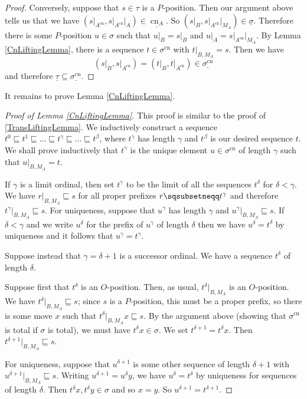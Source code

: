 \documentclass[11pt]{article} %
\theoremstyle{plain} %
\theoremstyle{definition} %
\theoremstyle{note}
\theoremstyle{exercisestyle}
\newcommand{\prefix}{\sqsubseteq}
\newcommand{\pprefix}{\sqsubsetneqq}
\newcommand{\grel}[1]{\underline{#1}}
\DeclareMathOperator{\cn}{cn}
\begin{document}
\begin{proof}
  Conversely, suppose that $s\in\tau$ is a $P$-position.  Then our argument above tells us that we have $(s\vert_{A^{\cn}},s\vert_{A^{\cn}}\vert_A)\in\grel{\cn_A}$.  So $(s\vert_B,s\vert_{A^{\cn}}\vert_{M_A})\in\grel\sigma$.  Therefore there is some $P$-position $u\in\sigma$ such that $u\vert_B=s\vert_B$ and $u\vert_A=s\vert_{A^{\cn}}\vert_{M_A}$.  By Lemma \ref{CnLiftingLemma}, there is a sequence $t\in\sigma^{\cn}$ with $t\vert_{B,M_A}=s$.  Then we have
  \[
    (s\vert_B,s\vert_{A^{\cn}})=(t\vert_B,t\vert_{A^{\cn}})\in\grel{\sigma^{\cn}}
    \]
  and therefore $\grel\tau\subseteq\grel{\sigma^{\cn}}$.  
\end{proof}

It remains to prove Lemma \ref{CnLiftingLemma}.  

\begin{proof}[Proof of Lemma \ref{CnLiftingLemma}]
  This proof is similar to the proof of \ref{TransLiftingLemma}.  We inductively construct a sequence $t^0\prefix t^1\prefix\dots\prefix t^\gamma\prefix\dots\prefix t^\beta$, where $t^\gamma$ has length $\gamma$ and $t^\beta$ is our desired sequence $t$.  We shall prove inductively that $t^\gamma$ is the unique element $u\in\sigma^{\cn}$ of length $\gamma$ such that $u\vert_{B,M_A}=t$.

  If $\gamma$ is a limit ordinal, then set $t^\gamma$ to be the limit of all the sequences $t^\delta$ for $\delta<\gamma$.  We have $r\vert_{B,M_A}\prefix s$ for all proper prefixes $r\pprefix t^{\gamma}$ and therefore $t^\gamma\vert_{B,M_A}\prefix s$.  For uniqueness, suppose that $u^\gamma$ has length $\gamma$ and $u^\gamma\vert_{B,M_A}\prefix s$.  If $\delta<\gamma$ and we write $u^\delta$ for the prefix of $u^\gamma$ of length $\delta$ then we have $u^\delta=t^\delta$ by uniqueness and it follows that $u^\gamma=t^\gamma$.

  Suppose instead that $\gamma=\delta+1$ is a successor ordinal.  We have a sequence $t^\delta$ of length $\delta$.  

  Suppose first that $t^\delta$ is an $O$-position.  Then, as usual, $t^\delta\vert_{B,M_A}$ is an $O$-position.  We have $t^\delta\vert_{B,M_A}\prefix s$; since $s$ is a $P$-position, this must be a proper prefix, so there is some move $x$ such that $t^\delta\vert_{B,M_A}x\prefix s$.  By the argument above (showing that $\sigma^{\cn}$ is total if $\sigma$ is total), we must have $t^\delta x\in\sigma$.  We set $t^{\delta+1}=t^\delta x$.  Then $t^{\delta+1}\vert_{B,M_A}\prefix s$.  

  For uniqueness, suppose that $u^{\delta+1}$ is some other sequence of length $\delta+1$ with $u^{\delta+1}\vert_{B,M_A}\prefix s$.  Writing $u^{\delta+1}=u^\delta y$, we have $u^{\delta}=t^\delta$ by uniqueness for sequences of length $\delta$.  Then $t^\delta x,t^\delta y\in\sigma$ and so $x=y$.  So $u^{\delta+1}=t^{\delta+1}$.  


\end{proof}
\end{document}
